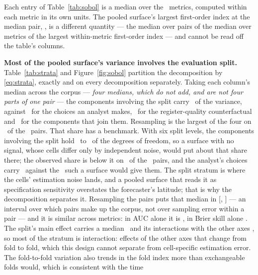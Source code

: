 Each entry of Table~\ref{tab:sobol} is a median over the \nInstruments\
metrics, computed within each metric in its own units. The pooled surface's
largest first-order index at the median pair, \largestFirstOrderPct, is a
different quantity --- the median over pairs of the median over metrics of
the largest within-metric first-order index --- and cannot be read off the
table's columns.



\textbf{Most of the pooled surface's variance involves the evaluation
split.} Table~\ref{tab:strata} and Figure~\ref{fig:sobol} partition the
decomposition by \eqref{eq:strata}, exactly and on every decomposition separately. Taking each
column's median across the corpus --- \emph{four medians, which do not add,
and are not four parts of one pair} --- the components involving the split
carry \shareResamplingStratumPct\ of the variance, against
\shareAnalystStratumPct\ for the choices an analyst makes,
\shareCounterfactualStratumPct\ for the register-quality counterfactual and
\shareMixedStratumPct\ for the components that join them. Resampling is the
largest of the four on \nResamplingLargest\ of the \nPairs\ pairs.
That share has a benchmark. With six split levels, the components involving
the split hold \splitNullShareMinPct\ to \splitNullShareMaxPct\ of the
degrees of freedom, so a surface with no signal, whose cells differ only by
independent noise, would put about that share there; the observed share is
below it on \nPairsSplitBelowNull\ of the \nPairs\ pairs, and the analyst's
choices carry \shareAnalystStratumPct\ against the \analystNullSharePct\ such
a surface would give them. The split stratum is where the cells' estimation
noise lands, and a pooled surface that reads it as specification sensitivity
overstates the forecaster's latitude; that is why the decomposition
separates it.
Resampling the pairs puts that median in
[\shareResamplingStratumLoPct, \shareResamplingStratumHiPct] --- an interval
over which pairs make up the corpus, not over sampling error within a pair ---
and it is similar across metrics: in AUC alone it is \splitShareAucPct, in
Brier skill alone \splitShareBrierPct. The split's main effect carries a median
\splitMainPct\ and its interactions with the other axes \splitInteractionsPct,
so most of the stratum is interaction: effects of the other axes that change
from fold to fold, which this design cannot separate from cell-specific
estimation error. The fold-to-fold variation also trends in the fold index
more than exchangeable folds would, which is consistent with the time
